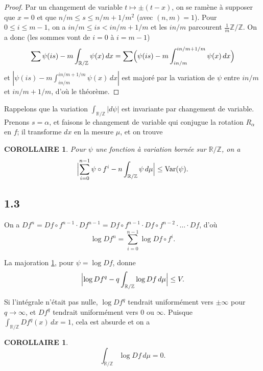 \documentclass[12pt]{amsart}
\theoremstyle{plain}
\newtheorem{corollaire}[theoreme]{COROLLAIRE}
\theoremstyle{remark}
\DeclareMathOperator*{\Var}{Var}
\begin{document}
\begin{proof}
Par un changement de variable $t \mapsto \pm(t-x)$, on se ram\`{e}ne \`{a} supposer que $x = 0$ et que $n/m \leq s \leq n/m + 1/m^{2}$ (avec $(n,m) = 1$). Pour $0 \leq i \leq m-1$, on a $in/m \leq is < in/m + 1/m$ et les $in/m$ parcourent $\frac{1}{m}\mathbb{Z}/\mathbb{Z}$. On a donc (les sommes vont de $i = 0$ \`{a} $i = m-1$)
\[
\sum \psi(is) - m \int_{\mathbb{R}/\mathbb{Z}} \psi(x)\,dx = \sum \Bigl(\psi(is) - m \int_{in/m}^{in/m+1/m} \psi(x)\,dx\Bigr)
\]
et $|\psi(is) - m\int_{in/m}^{in/m+1/m} \psi(x)\,dx|$ est major\'{e} par la variation de $\psi$ entre $in/m$ et $in/m + 1/m$, d'o\`{u} le th\'{e}or\`{e}me.
\end{proof}

Rappelons que la variation $\int_{\mathbb{R}/\mathbb{Z}} |d\psi|$ est invariante par changement de variable. Prenons $s = \alpha$, et faisons le changement de variable qui conjugue la rotation $R_{\alpha}$ en $f$; il transforme $dx$ en la mesure $\mu$, et on trouve

\begin{corollaire}\label{cor:12}
Pour $\psi$ une fonction \`{a} variation born\'{e}e sur $\mathbb{R}/\mathbb{Z}$, on a
\[
\Bigl|\sum_{i=0}^{n-1} \psi \circ f^{i} - n \int_{\mathbb{R}/\mathbb{Z}} \psi\,d\mu\Bigr| \leq \Var(\psi) .
\]
\end{corollaire}

\subsection*{1.3}
On a $Df^{n} = Df \circ f^{n-1} \cdot Df^{n-1} = Df \circ f^{n-1} \cdot Df \circ f^{n-2} \cdot \ldots \cdot Df$, d'o\`{u}
\begin{equation}\label{eq:131}
\log Df^{n} = \sum_{i=0}^{n-1} \log Df \circ f^{i} .
\end{equation}

La majoration \ref{cor:12}, pour $\psi = \log Df$, donne
\[
\Bigl|\log Df^{q} - q \int_{\mathbb{R}/\mathbb{Z}} \log Df\,d\mu\Bigr| \leq V .
\]

Si l'int\'{e}grale n'\'{e}tait pas nulle, $\log Df^{q}$ tendrait uniform\'{e}ment vers $\pm\infty$ pour $q \to \infty$, et $Df^{q}$ tendrait uniform\'{e}ment vers $0$ ou $\infty$. Puisque $\int_{\mathbb{R}/\mathbb{Z}} Df^{q}(x)\,dx = 1$, cela est absurde et on a

\begin{corollaire}\label{cor:14}
\[
\int_{\mathbb{R}/\mathbb{Z}} \log Df\,d\mu = 0 .
\]
\end{corollaire}
\end{document}
